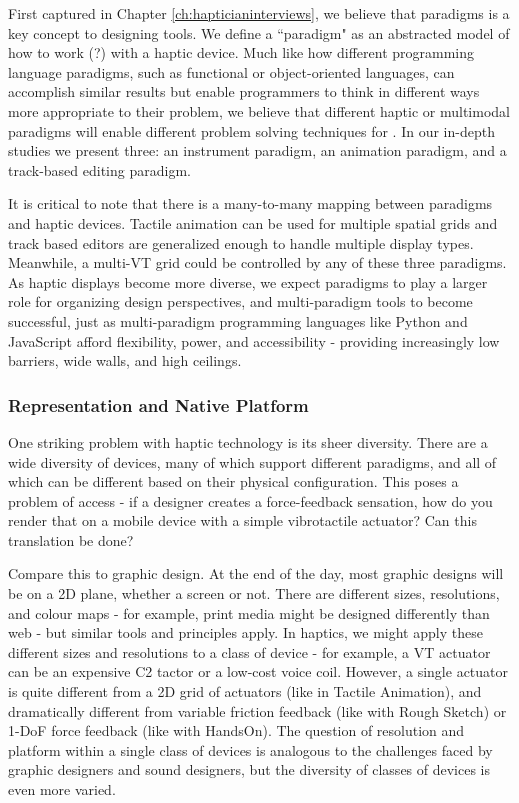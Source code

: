First captured in Chapter \ref{ch:hapticianinterviews}, we believe that paradigms is a key concept to designing \haxd tools.
We define a ``paradigm" as an abstracted model of how to work (?) with a haptic device.
Much like how different programming language paradigms, such as functional or object-oriented languages, can accomplish similar results but enable programmers to think in different ways more appropriate to their problem, we believe that different haptic or multimodal paradigms will enable different problem solving techniques for \haxd.
In our in-depth studies we present three: an instrument paradigm, an animation paradigm, and a track-based editing paradigm.

It is critical to note that there is a many-to-many mapping between paradigms and haptic devices.
Tactile animation can be used for multiple spatial grids and track based editors are generalized enough to handle multiple display types.
Meanwhile, a multi-VT grid could be controlled by any of these three paradigms.
As haptic displays become more diverse, we expect paradigms to play a larger role for organizing design perspectives, and multi-paradigm tools to become successful, just as multi-paradigm programming languages like Python and JavaScript afford flexibility, power, and accessibility - providing increasingly low barriers, wide walls, and high ceilings.


\subsubsection{Representation and Native Platform}
One striking problem with haptic technology is its sheer diversity.
There are a wide diversity of devices, many of which support different paradigms, and all of which can be different based on their physical configuration.
This poses a problem of access - if a designer creates a force-feedback sensation, how do you render that on a mobile device with a simple vibrotactile actuator?
Can this translation be done?

Compare this to graphic design.
At the end of the day, most graphic designs will be on a 2D plane, whether a screen or not.
There are different sizes, resolutions, and colour maps - for example, print media might be designed differently than web - but similar tools and principles apply.
In haptics, we might apply these different sizes and resolutions to a class of device - for example, a VT actuator can be an expensive C2 tactor or a low-cost voice coil.
However, a single actuator is quite different from a 2D grid of actuators (like in Tactile Animation), and dramatically different from variable friction feedback (like with Rough Sketch) or 1-DoF force feedback (like with HandsOn).
The question of resolution and platform within a single class of devices is analogous to the challenges faced by graphic designers and sound designers, but the diversity of classes of devices is even more varied.

